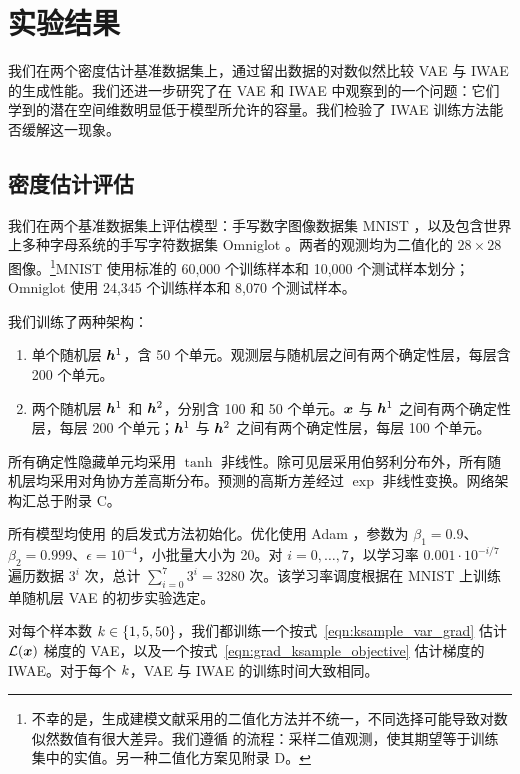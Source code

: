 \section{实验结果}
\label{sec:experiments}

我们在两个密度估计基准数据集上，通过留出数据的对数似然比较 VAE 与 IWAE 的生成性能。我们还进一步研究了在 VAE 和 IWAE 中观察到的一个问题：它们学到的潜在空间维数明显低于模型所允许的容量。我们检验了 IWAE 训练方法能否缓解这一现象。


\subsection{密度估计评估}

我们在两个基准数据集上评估模型：手写数字图像数据集 MNIST \citep{mnist}，以及包含世界上多种字母系统的手写字符数据集 Omniglot \citep{omniglot}。两者的观测均为二值化的 $28\times28$ 图像。\footnote{不幸的是，生成建模文献采用的二值化方法并不统一，不同选择可能导致对数似然数值有很大差异。我们遵循 \citet{ais-rbm} 的流程：采样二值观测，使其期望等于训练集中的实值。另一种二值化方案见附录 D。}MNIST 使用标准的 60,000 个训练样本和 10,000 个测试样本划分；Omniglot 使用 24,345 个训练样本和 8,070 个测试样本。

我们训练了两种架构：
\begin{enumerate}
\item 单个随机层 $\bm{h}^{1}$，含 50 个单元。观测层与随机层之间有两个确定性层，每层含 200 个单元。
\item 两个随机层 $\bm{h}^{1}$ 和 $\bm{h}^{2}$，分别含 100 和 50 个单元。$\bm{x}$ 与 $\bm{h}^{1}$ 之间有两个确定性层，每层 200 个单元；$\bm{h}^{1}$ 与 $\bm{h}^{2}$ 之间有两个确定性层，每层 100 个单元。
\end{enumerate}
所有确定性隐藏单元均采用 $\tanh$ 非线性。除可见层采用伯努利分布外，所有随机层均采用对角协方差高斯分布。预测的高斯方差经过 $\exp$ 非线性变换。网络架构汇总于附录 C。



所有模型均使用 \citet{initialization} 的启发式方法初始化。优化使用 Adam \citep{adam}，参数为 $\beta_1=0.9$、$\beta_2=0.999$、$\epsilon=10^{-4}$，小批量大小为 20。对 $i=0,\ldots,7$，以学习率 $0.001\cdot10^{-i/7}$ 遍历数据 $3^i$ 次，总计 $\sum_{i=0}^7 3^i=3280$ 次。该学习率调度根据在 MNIST 上训练单随机层 VAE 的初步实验选定。

对每个样本数 $k\in\{1,5,50\}$，我们都训练一个按式~\eqref{eqn:ksample_var_grad} 估计 $\mathcal{L}(\bm{x})$ 梯度的 VAE，以及一个按式~\eqref{eqn:grad_ksample_objective} 估计梯度的 IWAE。对于每个 $k$，VAE 与 IWAE 的训练时间大致相同。


